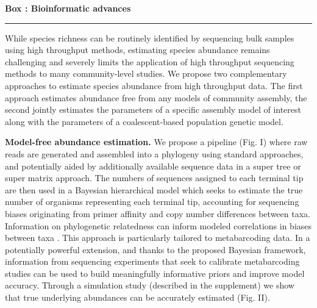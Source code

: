 \documentclass[12pt]{article}
\newcounter{Box}
\begin{document}
{\begin{minipage}{0.97\textwidth}
  \end{minipage}
}


\noindent
\colorbox{gray!20}{
  \begin{minipage}{0.97\textwidth}
    \label{box:dry}
    \noindent
    {\bf \large Box \theBox: Bioinformatic advances} 
    \vspace{1pt}
    \hrule
    \vspace{1pt}
    
    While species richness can be routinely identified by sequencing
    bulk samples using high throughput methods, estimating species
    abundance remains challenging \citep{elbrecht2015} and severely
    limits the application of high throughput sequencing methods to
    many community-level studies. We propose two complementary
    approaches to estimate species abundance from high throughput
    data.  The first approach estimates abundance free from any models
    of community assembly, the second jointly estimates the parameters
    of a specific assembly model of interest along with the parameters
    of a coalescent-based population genetic model.

    {\bf Model-free abundance estimation.} We propose a pipeline
    (Fig. I) where raw reads are generated and assembled into a
    phylogeny using standard approaches, and potentially aided by
    additionally available sequence data in a super tree or super
    matrix approach. The numbers of sequences assigned to each
    terminal tip are then used in a Bayesian hierarchical model which
    seeks to estimate the true number of organisms representing each
    terminal tip, accounting for sequencing biases originating from
    primer affinity and copy number differences between taxa.
    Information on phylogenetic relatedness can inform modeled
    correlations in biases between taxa \citep[e.g. copy number is
    known to be phylogenetically conserved]{foo}. This approach is
    particularly tailored to metabarcoding data. In a potentially
    powerful extension, and thanks to the proposed Bayesian framework,
    information from sequencing experiments that seek to calibrate
    metabarcoding studies \citep[e.g.,][]{henrik, Saitoh2016} can be
    used to build meaningfully informative priors and improve model
    accuracy. Through a simulation study (described in the supplement)
    we show that true underlying abundances can be accurately
    estimated (Fig. II).


\end{minipage}}
\end{document}
